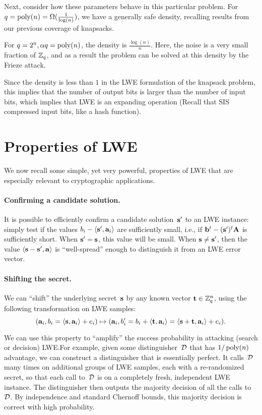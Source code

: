 \documentclass[11pt]{article}
\begin{document}
Next, consider how these parameters behave in this particular problem.
For $q = \operatorname{poly}(n) = \Omega(\frac{1}{\log(n)})$, we have a generally
safe density, recalling results from our previous coverage of
knapsacks.

For $q = 2^n, \alpha q = \operatorname{poly}(n)$, the density is
$\frac{\log(n)}{n}$. Here, the noise is a very small fraction of
$\mathbb{Z}_q$, and as a result the problem can be solved at this density by
the Frieze attack.

Since the density is less than $1$ in the LWE formulation of the
knapsack problem, this implies that the number of output bits is
larger than the number of input bits, which implies that LWE is an
expanding operation (Recall that SIS compressed input bits, like a
hash function).

\fi

\section{Properties of LWE}
\label{sec:properties}

We now recall some simple, yet very powerful, properties of LWE that
are especially relevant to cryptographic applications.

\paragraph{Confirming a candidate solution.}

It is possible to efficiently confirm a candidate solution~$\mathbf{s}'$ to
an LWE instance: simply test if the values
$b_{i} - \langle\mathbf{s}',\mathbf{a}_i\rangle$ are sufficiently small, i.e., if
$\mathbf{b}^{t} - (\mathbf{s}')^{t} \mathbf{A}$ is sufficiently short. When
$\mathbf{s}' = \mathbf{s}$, this value will be small. When $\mathbf{s} \neq \mathbf{s}'$,
then the value $\langle\mathbf{s} - \mathbf{s}',\mathbf{a}\rangle$ is ``well-spread''
enough to distinguish it from an LWE error vector.

\paragraph{Shifting the secret.}

We can ``shift'' the underlying secret~$\mathbf{s}$ by any known vector
$\mathbf{t} \in \mathbb{Z}_q^n$, using the following transformation on LWE samples:
\[ (\mathbf{a}_i, b_i = \langle\mathbf{s},\mathbf{a}_i\rangle+e_i) \mapsto (\mathbf{a}_i, b'_i =
  b_i + \langle\mathbf{t},\mathbf{a}_i\rangle = \langle\mathbf{s}+\mathbf{t},\mathbf{a}_i\rangle + e_i)
  . \]

We can use this property to ``amplify'' the success probability in
attacking (search or decision) LWE.\@ For example, given some
distinguisher~$\mathcal{D}$ that has $1/\operatorname{poly}(n)$ advantage, we can
construct a distinguisher that is essentially perfect. It
calls~$\mathcal{D}$ many times on additional groups of LWE samples, each
with a re-randomized secret, so that each call to~$\mathcal{D}$ is on a
completely fresh, independent LWE instance. The distinguisher then
outputs the majority decision of all the calls to~$\mathcal{D}$. By
independence and standard Chernoff bounds, this majority decision is
correct with high probability.
\end{document}
